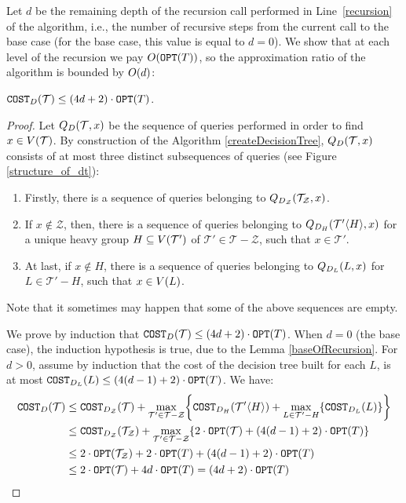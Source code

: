 Let $d$ be the remaining depth of the recursion call performed in Line~\ref{recursion} of the algorithm, i.e., the number of recursive steps from the current call to the base case (for the base case, this value is equal to $d=0$). We show that at each level of the recursion we pay $O\mathopen{}\left( \texttt{OPT}\mathopen{}\left( T \right) \right)$, so the approximation ratio of the algorithm is bounded by $O\mathopen{}\left( d \right)$:
\begin{lemma}\label{costofthesolution}
$\texttt{COST}_D\mathopen{}\left( \mathcal{T} \right)\leq\mathopen{}\left( 4 d+2 \right)\cdot\texttt{OPT}\mathopen{}\left( T \right)$.
    \begin{proof}
        
    Let $Q_D\mathopen{}\left( \mathcal{T},x \right)$ be the sequence of queries performed in order to find $x\in V\mathopen{}\left( \mathcal{T} \right)$. By construction of the Algorithm \ref{createDecisionTree}, $Q_D\mathopen{}\left( \mathcal{T},x \right)$ consists of at most three distinct subsequences of queries (see Figure \ref{structure_of_dt}):
    \begin{enumerate}
        \item Firstly, there is a sequence of queries belonging to $Q_{D_{\mathcal{Z}}}\mathopen{}\left( \mathcal{T}_{\mathcal{Z}},x \right)$.
        \item If $x\notin \mathcal{Z}$, then, there is a sequence of queries belonging to $Q_{D_{H}}\mathopen{}\left( \mathcal{T}'\mathopen{}\langle H \rangle,x \right)$ for a unique heavy group $H\subseteq V\mathopen{}\left( \mathcal{T}' \right)$ of $\mathcal{T}'\in\mathcal{T}-\mathcal{Z}$, such that $x\in \mathcal{T}'$.
        \item At last, if $x\notin H$, there is a sequence of queries belonging to $Q_{D_{L}}\mathopen{}\left( L,x \right)$ for $L\in \mathcal{T}'-H$, such that $x\in V\mathopen{}\left( L \right)$. 
    \end{enumerate}  

    Note that it sometimes may happen that some of the above sequences are empty.
    
    We prove by induction that $\texttt{COST}_{D}\mathopen{}\left( \mathcal{T} \right)\leq \mathopen{}\left( 4d +2 \right)\cdot \texttt{OPT}\mathopen{}\left( T \right)$. When $d=0$ (the base case), the induction hypothesis is true, due to the Lemma \ref{baseOfRecursion}. For $d>0$, assume by induction that the cost of the decision tree  built for each $L$, is at most $\texttt{COST}_{D_L}\mathopen{}\left( L \right)\leq \mathopen{}\left( 4\mathopen{}\left( d-1 \right) +2 \right)\cdot \texttt{OPT}\mathopen{}\left( T \right)$. We have:
        \begin{align*}
        \texttt{COST}_D\mathopen{}\left( \mathcal{T} \right)
        &\leq
        \texttt{COST}_{D_{\mathcal{Z}}}\mathopen{}\left( \mathcal{T} \right)+\max_{\mathcal{T}'\in \mathcal{T}-\mathcal{Z}}\mathopen{}\left\{ \texttt{COST}_{D_H}\mathopen{}\left( \mathcal{T}'\mathopen{}\langle H \rangle \right)+\max_{L\in \mathcal{T}'-H}\mathopen{}\left\{ \texttt{COST}_{D_L}\mathopen{}\left( L \right) \right\} \right\}
         \\ 
        &\leq
        \texttt{COST}_{D_{\mathcal{Z}}}\mathopen{}\left( \mathcal{T}_{\mathcal{Z}} \right)+\max_{\mathcal{T}'\in \mathcal{T}-\mathcal{Z}}\mathopen{}\left\{ 2\cdot\texttt{OPT}\mathopen{}\left( \mathcal{T} \right)+\mathopen{}\left( 4\mathopen{}\left( d-1 \right) +2 \right)\cdot \texttt{OPT}\mathopen{}\left( T \right) \right\}
        \\ 
        &\leq 
        2\cdot\texttt{OPT}\mathopen{}\left( \mathcal{T}_{\mathcal{Z}} \right)+2\cdot\texttt{OPT}\mathopen{}\left( T \right)+ \mathopen{}\left( 4\mathopen{}\left( d-1 \right) +2 \right)\cdot \texttt{OPT}\mathopen{}\left( T \right) 
        \\
        &
        \leq 
        2\cdot\texttt{OPT}\mathopen{}\left( \mathcal{T} \right)+4d\cdot \texttt{OPT}\mathopen{}\left( T \right) = \mathopen{}\left( 4d+2 \right)\cdot \texttt{OPT}\mathopen{}\left( T \right)
        \end{align*}
        

\end{proof}
\end{lemma}
